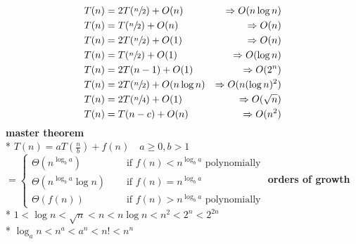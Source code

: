 \documentclass[10pt, landscape]{article}
\newenvironment{tightcenter}{%
  \setlength\topsep{0pt}
  \setlength\parskip{0pt}
  \begin{center}
}{%
  \end{center}
}
\let\then\Rightarrow
\begin{document}
\begin{multicols}{4}
\begin{tightcenter}
\begin{align*}T(n) &= 2T(\sfrac{n}{2}) + O(n) &\Rightarrow O(n \log n)
    \\ T(n) &= T(\sfrac{n}{2}) + O(n) &\Rightarrow O(n)
    \\ T(n) &= 2T(\sfrac{n}{2}) + O(1) &\Rightarrow O(n)
    \\ T(n) &= T(\sfrac{n}{2}) + O(1) &\Rightarrow O(\log n)
    \\ T(n) &= 2T(n - 1) + O(1) &\Rightarrow O(2^n)
    \\ T(n) &= 2T(\sfrac{n}{2}) + O(n \log n) &\Rightarrow O(n(\log n)^2)
    \\ T(n) &= 2T(\sfrac{n}{4}) + O(1) &\Rightarrow O(\sqrt{n})
    \\ T(n) &= T(n - c) + O(n) &\Rightarrow O(n^2)
\end{align*}
\textbf{master theorem}
    \\* $T(n) = aT(\frac{n}{b}) + f(n) \quad a \geq 0, b > 1$
    $= \begin{cases}
        \Theta(n^{\log_ba}) & \quad \text{ if } f(n) < n^{\log_ba} \text{ polynomially}
        \\ \Theta(n^{\log_ba} \log n) & \quad \text{ if } f(n) = n^{\log_ba} 
        \\ \Theta(f(n)) & \quad \text{ if } f(n) > n^{\log_ba} \text{ polynomially}
    \end{cases}$
\textbf{orders of growth}
\\* $1 < \log n < \sqrt{n} < n < n \log n < n^2 < 2^n < 2^{2n}$
\\* $\log_a n < n^a < a^n < n! < n^n$ 
\end{tightcenter}



\end{multicols}
\end{document}
